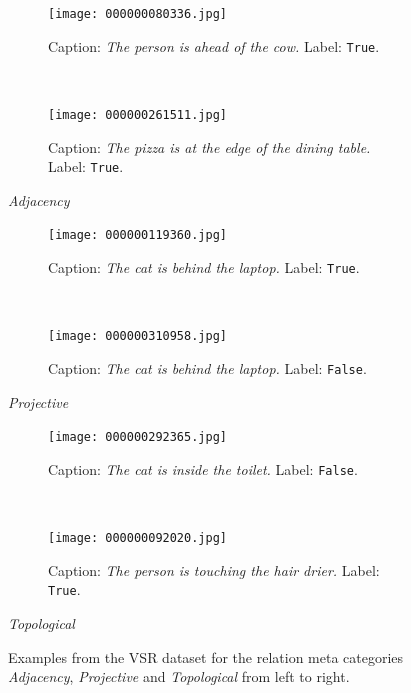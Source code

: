 \begin{figure}[ht]
\centering
    \begin{minipage}[t]{.30\textwidth}
        \begin{subfigure}[t]{\textwidth}
        \centering
        \texttt{[image: 000000080336.jpg]}
        \caption{Caption: \textit{The person is ahead of the cow.} Label: \texttt{True}.}
        \label{fig:person_cow}
        \end{subfigure}\\
        \begin{subfigure}[t]{\textwidth}
        \centering
        \texttt{[image: 000000261511.jpg]}
        \caption{Caption: \textit{The pizza is at the edge of the dining table.} Label: \texttt{True}.}
        \label{fig:pizza_table}
        \end{subfigure}%
        \caption*{\textit{Adjacency}}
    \end{minipage}
    \hfill
    \begin{minipage}[t]{.30\textwidth}
        \begin{subfigure}[t]{\textwidth}
        \centering
        \texttt{[image: 000000119360.jpg]}
        \caption{Caption: \textit{The cat is behind the laptop.} Label: \texttt{True}.}
        \end{subfigure}\\
        \begin{subfigure}[t]{\textwidth}
        \centering
        \texttt{[image: 000000310958.jpg]}
        \caption{Caption: \textit{The cat is behind the laptop.} Label: \texttt{False}.}
        \end{subfigure}%
        \caption*{\textit{Projective}}
    \end{minipage}
    \hfill
    \begin{minipage}[t]{.30\textwidth}
        \begin{subfigure}[t]{\textwidth}
        \centering
        \texttt{[image: 000000292365.jpg]}
        \caption{Caption: \textit{The cat is inside the toilet.} Label: \texttt{False}.}
        \label{fig:cat_toilet_true}
        \end{subfigure}\\
        \begin{subfigure}[t]{\textwidth}
        \centering
        \texttt{[image: 000000092020.jpg]}
        \caption{Caption: \textit{The person is touching the hair drier.} Label: \texttt{True}.}
        \label{fig:cat_toilet}
        \end{subfigure}%
        \caption*{\textit{Topological}}
    \end{minipage}%
    \caption{Examples from the VSR dataset for the relation meta categories \textit{Adjacency}, \textit{Projective} and \textit{Topological} from left to right.}
    \label{fig:vsr-examples}
\end{figure}

